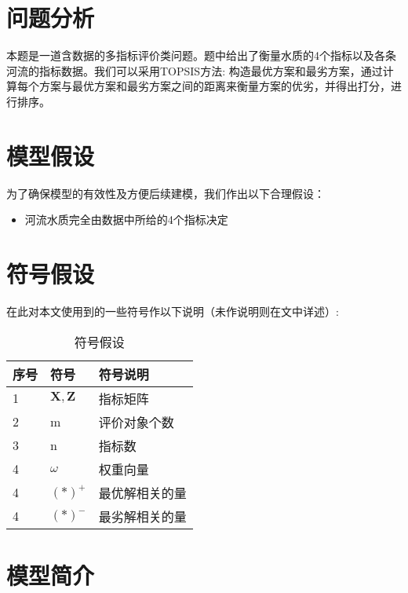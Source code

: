 \documentclass[withoutpreface]{cumcmthesis}
\begin{document}
    \section{问题分析}

    本题是一道含数据的多指标评价类问题。题中给出了衡量水质的4个指标以及各条河流的指标数据。我们可以采用TOPSIS方法: 构造最优方案和最劣方案，通过计算每个方案与最优方案和最劣方案之间的距离来衡量方案的优劣，并得出打分，进行排序。

    \section{模型假设}

    为了确保模型的有效性及方便后续建模，我们作出以下合理假设：

    \begin{itemize}
        \item 河流水质完全由数据中所给的4个指标决定
    \end{itemize}

    \section{符号假设}

    在此对本文使用到的一些符号作以下说明（未作说明则在文中详述）:

    \begin{table}[H]
        \centering
        \caption{符号假设}\label{Tab:2}
        \begin{tabular}{p{30pt}<{\centering}|p{100pt}<{\centering}@{}p{260pt}<{\centering}}
        \hline
        \rowcolor{color2} 序号 & 符号 & 符号说明 \\
        \hline
        \rowcolor{color1} 1 & $\mathbf{X},\mathbf{Z}$		& 指标矩阵 \\
        \rowcolor{color1} 2 & m & 评价对象个数 \\
        \rowcolor{color1} 3 & n & 指标数\\
        \rowcolor{color1} 4 & $\omega$		& 权重向量 \\
        \rowcolor{color1} 4 & $(*)^+$		& 最优解相关的量 \\
        \rowcolor{color1} 4 & $(*)^-$		& 最劣解相关的量 \\
        \hline
        \end{tabular}
    \end{table}

    \section{模型简介}
\end{document}
